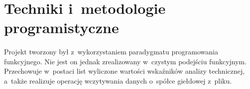 \section{Techniki i~metodologie programistyczne}

\paragraph{}
Projekt tworzony był z~wykorzystaniem paradygmatu programowania funkcyjnego. Nie jest on jednak zrealizowany w~czystym podejściu funkcyjnym. Przechowuje w~postaci list wyliczone wartości wskaźników analizy technicznej, a~także realizuje operację wczytywania danych o~spółce giełdowej z~pliku.
